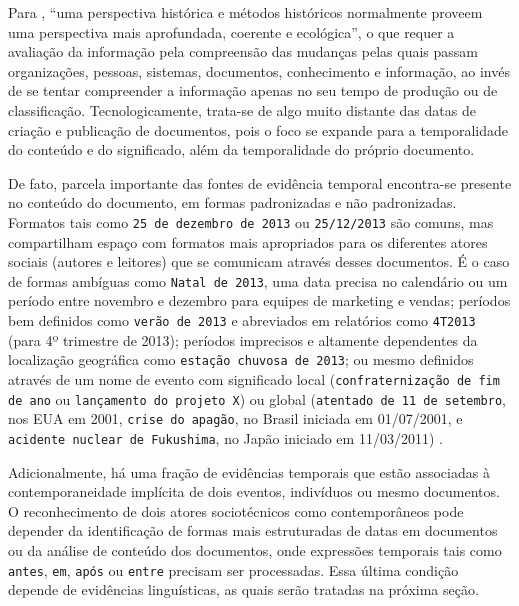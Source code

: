 Para , ``uma perspectiva histórica e métodos históricos normalmente proveem uma perspectiva mais aprofundada, coerente e ecológica'', o que requer a avaliação da informação pela compreensão das mudanças pelas quais passam organizações, pessoas, sistemas, documentos, conhecimento e informação, ao invés de se tentar compreender a informação apenas no seu tempo de produção ou de classificação. Tecnologicamente, trata-se de algo muito distante das datas de criação e publicação de documentos, pois o foco se expande para a temporalidade do conteúdo e do significado, além da temporalidade do próprio documento.

De fato, parcela importante das fontes de evidência temporal encontra-se presente no conteúdo do documento, em formas padronizadas e não padronizadas. Formatos tais como \texttt{25 de dezembro de 2013} ou \texttt{25/12/2013} são comuns, mas compartilham espaço com formatos mais apropriados para os diferentes atores sociais (autores e leitores) que se comunicam através desses documentos. É o caso de formas ambíguas como \texttt{Natal de 2013}, uma data precisa no calendário ou um período entre novembro e dezembro para equipes de marketing e vendas; períodos bem definidos como \texttt{verão de 2013} e abreviados em relatórios como \texttt{4T2013} (para 4º trimestre de 2013); períodos imprecisos e altamente dependentes da localização geográfica como \texttt{estação chuvosa de 2013}; ou mesmo definidos através de um nome de evento com significado local (\texttt{confraternização de fim de ano} ou \texttt{lançamento do projeto X}) ou global (\texttt{atentado de 11 de setembro}, nos EUA em 2001, \texttt{crise do apagão}, no Brasil iniciada em 01/07/2001, e \texttt{acidente nuclear de Fukushima}, no Japão iniciado em 11/03/2011) \cite{rula12temporal}.

Adicionalmente, há uma fração de evidências temporais que estão associadas à contemporaneidade implícita de dois eventos, indivíduos ou mesmo documentos. O reconhecimento de dois atores sociotécnicos como contemporâneos pode depender da identificação de formas mais estruturadas de datas em documentos ou da análise de conteúdo dos documentos, onde expressões temporais tais como \texttt{antes}, \texttt{em}, \texttt{após} ou \texttt{entre} precisam ser processadas. Essa última condição depende de evidências linguísticas, as quais serão tratadas na próxima seção.



